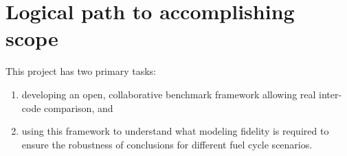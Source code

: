 \section{Logical path to accomplishing scope}

This project has two primary tasks:
\begin{enumerate}
\item developing an open, collaborative benchmark framework allowing real
  inter-code comparison, and
\item using this framework to understand what modeling fidelity is required to
  ensure the robustness of conclusions for different fuel cycle scenarios.
\end{enumerate}





